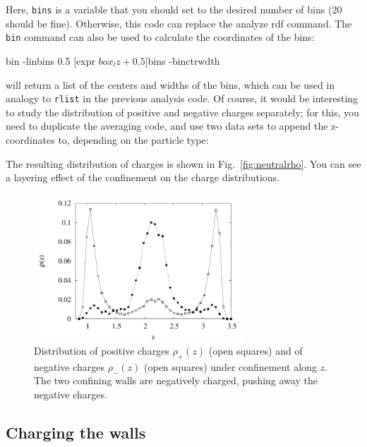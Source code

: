 \documentclass[
a4paper,                        %
11pt,                           %
twoside,                        %
footsepline,                    %
headsepline,                    %
headexclude,                    %
footexclude,                    %
pagesize,                       %
]{scrartcl}
\begin{document}
Here, \verb|bins| is a variable that you should set to the desired
number of bins (20 should be fine). Otherwise, this code can replace
the analyze rdf command. The \verb|bin| command can also be used to
calculate the coordinates of the bins:

\begin{tclcode}
  bin -linbins 0.5 [expr $box_lz + 0.5] $bins -binctrwdth
\end{tclcode}

will return a list of the centers and widths of the bins, which can be
used in analogy to \verb|rlist| in the previous analysis code. Of
course, it would be interesting to study the distribution of positive
and negative charges separately; for this, you need to duplicate the
averaging code, and use two data sets to append the z-coordinates to,
depending on the particle type:


The resulting distribution of charges is shown in
Fig.~\ref{fig:neutralrho}. You can see a layering effect of the
confinement on the charge distributions.

\begin{figure}[h]
  \centering
  \includegraphics[width=0.7\textwidth]{figures/nonneutral-rho}
  \caption{Distribution of positive charges $\rho_+(z)$ (open squares)
    and of negative charges $\rho_-(z)$ (open squares) under
    confinement along $z$. The two confining walls are negatively
    charged, pushing away the negative charges.}
  \label{fig:nonneutralrho}
\end{figure}

\subsection*{Charging the walls}
\end{document}
